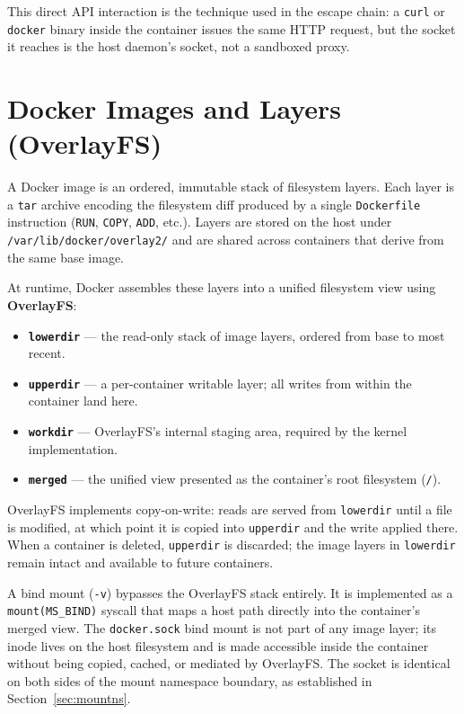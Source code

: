 This direct API interaction is the technique used in the escape chain: a
\texttt{curl} or \texttt{docker} binary inside the container issues the same HTTP
request, but the socket it reaches is the host daemon's socket, not a sandboxed
proxy.


\section{Docker Images and Layers (OverlayFS)}

A Docker image is an ordered, immutable stack of filesystem layers. Each layer is
a \texttt{tar} archive encoding the filesystem diff produced by a single
\texttt{Dockerfile} instruction (\texttt{RUN}, \texttt{COPY}, \texttt{ADD}, etc.).
Layers are stored on the host under \texttt{/var/lib/docker/overlay2/} and are
shared across containers that derive from the same base image.

At runtime, Docker assembles these layers into a unified filesystem view using
\textbf{OverlayFS}:

\begin{itemize}
    \item \textbf{\texttt{lowerdir}} --- the read-only stack of image layers,
          ordered from base to most recent.
    \item \textbf{\texttt{upperdir}} --- a per-container writable layer; all writes
          from within the container land here.
    \item \textbf{\texttt{workdir}} --- OverlayFS's internal staging area, required
          by the kernel implementation.
    \item \textbf{\texttt{merged}} --- the unified view presented as the container's
          root filesystem (\texttt{/}).
\end{itemize}

OverlayFS implements copy-on-write: reads are served from \texttt{lowerdir} until a
file is modified, at which point it is copied into \texttt{upperdir} and the write
applied there. When a container is deleted, \texttt{upperdir} is discarded; the image
layers in \texttt{lowerdir} remain intact and available to future containers.

A bind mount (\texttt{-v}) bypasses the OverlayFS stack entirely. It is implemented
as a \texttt{mount(MS\_BIND)} syscall that maps a host path directly into the
container's merged view. The \texttt{docker.sock} bind mount is not part of any image
layer; its inode lives on the host filesystem and is made accessible inside the
container without being copied, cached, or mediated by OverlayFS. The socket is
identical on both sides of the mount namespace boundary, as established in
Section~\ref{sec:mountns}.


